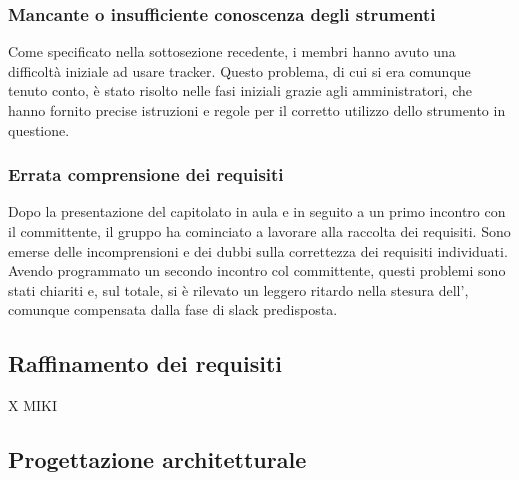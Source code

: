 \documentclass[a4paper, titlepage]{article}
\begin{document}
	\subsubsection{Mancante o insufficiente conoscenza degli strumenti}
	Come specificato nella sottosezione recedente, i membri hanno avuto una difficoltà iniziale ad usare tracker. Questo problema, di cui si era comunque tenuto conto, è stato risolto nelle fasi iniziali grazie agli amministratori, che hanno fornito precise istruzioni e regole per il corretto utilizzo dello strumento in questione.
	
	\subsubsection{Errata comprensione dei requisiti}
	Dopo la presentazione del capitolato in aula e in seguito a un primo incontro con il committente, il gruppo ha cominciato a lavorare alla raccolta dei requisiti. Sono emerse delle incomprensioni e dei dubbi sulla correttezza dei requisiti individuati. Avendo programmato un secondo incontro col committente, questi problemi sono stati chiariti e, sul totale, si è rilevato un leggero ritardo nella stesura dell', comunque compensata dalla fase di slack predisposta.
	
	\subsection{Raffinamento dei requisiti}
	X MIKI
	
	
	
	
	
	\subsection{Progettazione architetturale}
	
\end{document}
